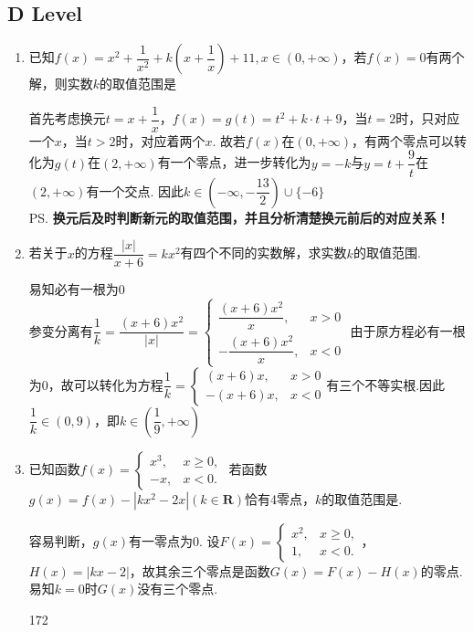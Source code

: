 \subsection*{D Level}
\begin{enumerate}
    \item 已知$f(x) = x^2 + \dfrac{1}{x^2} + k \left(x + \dfrac{1}{x}\right)+11, x \in (0, +\infty)$，若$f(x) = 0$有两个解，则实数$k$的取值范围是
    \begin{jieda}
        首先考虑换元$t = x + \dfrac{1}{x}$，$f(x) = g(t) = t^2+k\cdot t + 9$，当$t = 2$时，只对应一个$x$，当$t > 2$时，对应着两个$x$. 故若$f(x)$在$(0, +\infty)$，有两个零点可以转化为$g(t)$在$(2, +\infty)$有一个零点，进一步转化为$y = -k$与$y = t + \dfrac{9}{t}$在$(2, +\infty)$有一个交点. 因此$k \in \left(-\infty, -\dfrac{13}{2}\right) \cup \{-6\}$ \\
        \ps \textbf{换元后及时判断新元的取值范围，并且分析清楚换元前后的对应关系！}
    \end{jieda}
    \item 若关于$x$的方程$\dfrac{|x|}{x+6} = kx^2$有四个不同的实数解，求实数$k$的取值范围.
    \begin{jieda}
        易知必有一根为0 \\
        参变分离有$\dfrac{1}{k} = \dfrac{(x+6)x^2}{|x|} = \left \{ \begin{array}{ll}
            \dfrac{(x+6)x^2}{x}, & x > 0 \\
            -\dfrac{(x+6)x^2}{x},  & x < 0
        \end{array}\right.$
        由于原方程必有一根为0，故可以转化为方程$\dfrac{1}{k} = \left \{ \begin{array}{ll}
            (x+6)x, & x > 0 \\
            -(x+6)x,  & x < 0
        \end{array}\right.$有三个不等实根.因此$\dfrac{1}{k} \in (0, 9)$，即$k \in \left(\dfrac{1}{9}, +\infty\right)$
    \end{jieda}
    \item 已知函数$f(x) = \left\{  
         \begin{array}{ll}  
            x^3, & x \geq 0, \\  
            -x, & x < 0.
         \end{array}
    \right.$ 若函数$g(x) = f(x) - |kx^2-2x| (k \in \mathbf{R})$恰有4零点，$k$的取值范围是.
    \begin{jieda}
        容易判断，$g(x)$有一零点为0. 设$F(x) = \left\{  
         \begin{array}{ll}  
            x^2, & x \geq 0, \\  
            1, & x < 0.
         \end{array}
        \right.$，$H(x) = |kx-2|$，故其余三个零点是函数$G(x) = F(x) - H(x)$的零点.易知$k = 0$时$G(x)$没有三个零点. 
        \begin{dingautolist}{172}
            

\end{dingautolist}
\end{jieda}
\end{enumerate}
